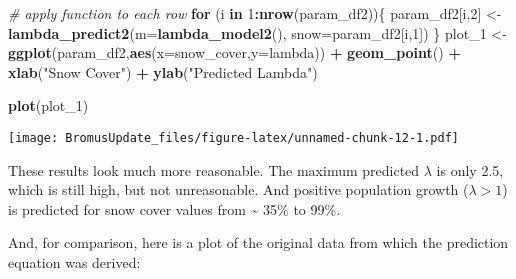 \documentclass[]{article}
\newenvironment{Shaded}{\begin{snugshade}}{\end{snugshade}}
\newcommand{\CommentTok}[1]{\textcolor[rgb]{0.56,0.35,0.01}{\textit{#1}}}
\newcommand{\ControlFlowTok}[1]{\textcolor[rgb]{0.13,0.29,0.53}{\textbf{#1}}}
\newcommand{\DataTypeTok}[1]{\textcolor[rgb]{0.13,0.29,0.53}{#1}}
\newcommand{\DecValTok}[1]{\textcolor[rgb]{0.00,0.00,0.81}{#1}}
\newcommand{\KeywordTok}[1]{\textcolor[rgb]{0.13,0.29,0.53}{\textbf{#1}}}
\newcommand{\NormalTok}[1]{#1}
\newcommand{\OperatorTok}[1]{\textcolor[rgb]{0.81,0.36,0.00}{\textbf{#1}}}
\newcommand{\StringTok}[1]{\textcolor[rgb]{0.31,0.60,0.02}{#1}}
\begin{document}
\begin{Shaded}
\begin{Highlighting}[]
\CommentTok{# apply function to each row}
\ControlFlowTok{for}\NormalTok{ (i }\ControlFlowTok{in} \DecValTok{1}\OperatorTok{:}\KeywordTok{nrow}\NormalTok{(param_df2))\{}
\NormalTok{  param_df2[i,}\DecValTok{2}\NormalTok{] <-}\StringTok{ }\KeywordTok{lambda_predict2}\NormalTok{(}\DataTypeTok{m=}\KeywordTok{lambda_model2}\NormalTok{(),}
                                  \DataTypeTok{snow=}\NormalTok{param_df2[i,}\DecValTok{1}\NormalTok{])}
\NormalTok{\}}
\NormalTok{plot_}\DecValTok{1}\NormalTok{ <-}\StringTok{ }\KeywordTok{ggplot}\NormalTok{(param_df2,}\KeywordTok{aes}\NormalTok{(}\DataTypeTok{x=}\NormalTok{snow_cover,}\DataTypeTok{y=}\NormalTok{lambda)) }\OperatorTok{+}
\StringTok{          }\KeywordTok{geom_point}\NormalTok{() }\OperatorTok{+}
\StringTok{          }\KeywordTok{xlab}\NormalTok{(}\StringTok{"Snow Cover"}\NormalTok{) }\OperatorTok{+}
\StringTok{          }\KeywordTok{ylab}\NormalTok{(}\StringTok{"Predicted Lambda"}\NormalTok{)}

\KeywordTok{plot}\NormalTok{(plot_}\DecValTok{1}\NormalTok{)}
\end{Highlighting}
\end{Shaded}

\texttt{[image: BromusUpdate\_files/figure-latex/unnamed-chunk-12-1.pdf]}

These results look much more reasonable. The maximum predicted
\(\lambda\) is only 2.5, which is still high, but not unreasonable. And
positive population growth (\(\lambda > 1\)) is predicted for snow cover
values from \textasciitilde{} 35\% to 99\%.

And, for comparison, here is a plot of the original data from which the
prediction equation was derived:

\begin{Shaded}
\end{Shaded}
\end{document}
